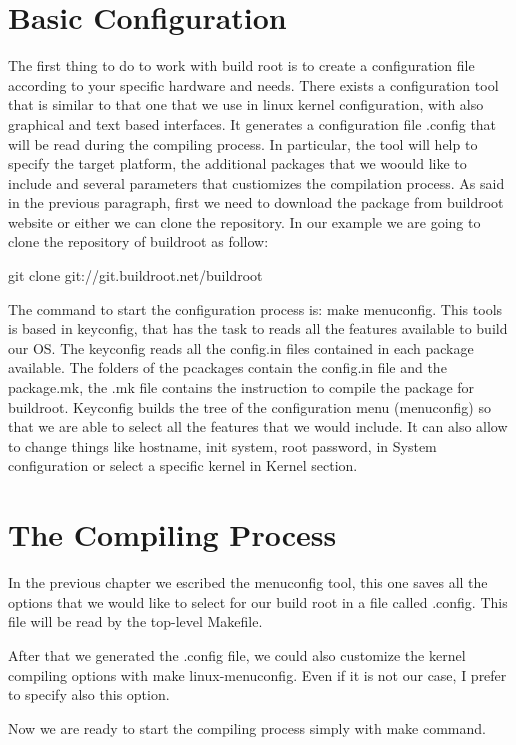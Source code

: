 \documentclass[a4paper,twoside,11pt]{article}
\begin{document}
\section{Basic Configuration}
The first thing to do to work with build root is to create a configuration file according to your specific hardware and needs.
There exists a configuration tool that is similar to that one that we use in linux kernel configuration, with also graphical and text based interfaces.
It generates a configuration file .config that will be read during the compiling process.
In particular, the tool will help to specify the target platform, the additional packages that we woould like to include and several parameters that custiomizes the compilation process.
As said in the previous paragraph, first we need to download the package from buildroot website or either we can clone the repository.
In our example we are going to clone the repository  of buildroot as follow:

git clone git://git.buildroot.net/buildroot

The command to start the configuration process is: 
make menuconfig.
This tools is based in keyconfig, that has the task to reads all the features available to build our OS.
The keyconfig reads all the config.in files contained in each package available.
The folders of the pcackages contain the config.in file and the package.mk, the .mk file contains the instruction to compile the package for buildroot.
Keyconfig builds the tree of the configuration menu (menuconfig) so that we are able to select all the features that we would include.
It can also allow to change things like hostname, init system, root password, in System configuration or select a specific kernel in Kernel section.

\section{The Compiling Process}
In the previous chapter we escribed the menuconfig tool, this one saves all the options that we would like to select for our build root in a file called .config.
This file will be read by the top-level Makefile.

After that we generated the .config file, we could also customize the kernel compiling options with make linux-menuconfig.
Even if it is not our case, I prefer to specify also this option.
 
Now we are ready to start the compiling process simply with make command.
\end{document}
